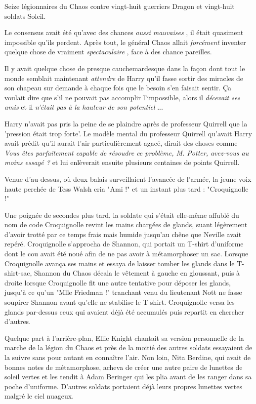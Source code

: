 Seize légionnaires du Chaos contre vingt-huit guerriers Dragon et vingt-huit soldats Soleil.

Le consensus avait été qu'avec des chances \emph{aussi mauvaises} , il était quasiment impossible qu'ils perdent. Après tout, le général Chaos allait \emph{forcément}  inventer quelque chose de vraiment \emph{spectaculaire} , face à des chance pareilles.

Il y avait quelque chose de presque cauchemardesque dans la façon dont tout le monde semblait maintenant \emph{attendre}  de Harry qu'il fasse sortir des miracles de son chapeau sur demande à chaque fois que le besoin s'en faisait sentir. Ça voulait dire que s'il ne pouvait pas accomplir l'impossible, alors il \emph{décevait ses amis}  et il \emph{n'était pas à la hauteur de son potentiel} ...

Harry n'avait pas pris la peine de se plaindre après de professeur Quirrell que la 'pression était trop forte'. Le modèle mental du professeur Quirrell qu'avait Harry avait prédit qu'il aurait l'air particulièrement agacé, dirait des choses comme \emph{Vous êtes parfaitement capable de résoudre ce problème, M. Potter, avez-vous au moins essayé ?}  et lui enlèverait ensuite plusieurs centaines de points Quirrell.

Venue d'au-dessus, où deux balais surveillaient l'avancée de l'armée, la jeune voix haute perchée de Tess Walsh cria "Ami !" et un instant plus tard : "Croquignolle !"

Une poignée de secondes plus tard, la soldate qui s'était elle-même affublé du nom de code Croquignolle revint les mains chargées de glands, suant légèrement d'avoir trotté par ce temps frais mais humide jusqu'au chêne que Neville avait repéré. Croquignolle s'approcha de Shannon, qui portait un T-shirt d'uniforme dont le cou avait été noué afin de ne pas avoir à métamorphoser un sac. Lorsque Croquignolle avança ses mains et essaya de laisser tomber les glands dans le T-shirt-sac, Shannon du Chaos décala le vêtement à gauche en gloussant, puis à droite lorsque Croquignolle fit une autre tentative pour déposer les glands, jusqu'à ce qu'un "Mlle Friedman !" tranchant venu du lieutenant Nott ne fasse soupirer Shannon avant qu'elle ne stabilise le T-shirt. Croquignolle versa les glands par-dessus ceux qui avaient déjà été accumulés puis repartit en chercher d'autres.

Quelque part à l'arrière-plan, Ellie Knight chantait sa version personnelle de la marche de la légion du Chaos et près de la moitié des autres soldats essayaient de la suivre sans pour autant en connaître l'air. Non loin, Nita Berdine, qui avait de bonnes notes de métamorphose, acheva de créer une autre paire de lunettes de soleil vertes et les tendit à Adam Beringer qui les plia avant de les ranger dans sa poche d'uniforme. D'autres soldats portaient déjà leurs propres lunettes vertes malgré le ciel nuageux.

